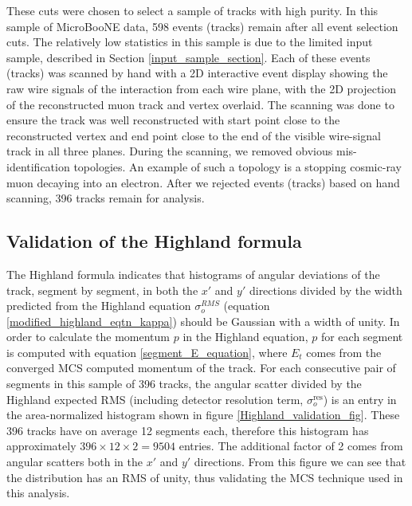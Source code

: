 \documentclass[a4paper,11pt]{article}
\begin{document}
These cuts were chosen to select a sample of tracks with high purity. In this sample of MicroBooNE data, 598 events (tracks) remain after all event selection cuts. The relatively low statistics in this sample is due to the limited input sample, described in Section \ref{input_sample_section}. Each of these events (tracks) was scanned by hand with a 2D interactive event display showing the raw wire signals of the interaction from each wire plane, with the 2D projection of the reconstructed muon track and vertex overlaid. The scanning was done to ensure the track was well reconstructed with start point close to the reconstructed vertex and end point close to the end of the visible wire-signal track in all three planes. During the scanning, we removed obvious mis-identification topologies. An example of such a topology is a stopping cosmic-ray muon decaying into an electron. After we rejected events (tracks) based on hand scanning, 396 tracks remain for analysis.


\subsection{Validation of the Highland formula}\label{highland_validation_section}
The Highland formula indicates that histograms of angular deviations of the track, segment by segment, in both the $x'$ and $y'$ directions divided by the width predicted from the Highland equation $\sigma_o^{RMS}$ (equation \ref{modified_highland_eqtn_kappa}) should be Gaussian with a width of unity. In order to calculate the momentum $p$ in the Highland equation, $p$ for each segment is computed with equation \ref{segment_E_equation}, where $E_t$ comes from the converged MCS computed momentum of the track. For each consecutive pair of segments in this sample of 396 tracks, the angular scatter divided by the Highland expected RMS (including detector resolution term, $\sigma_o^{\text{res}}$) is an entry in the area-normalized histogram shown in figure \ref{Highland_validation_fig}. These 396 tracks have on average 12 segments each, therefore this histogram has approximately $396\times12\times2=9504$ entries. The additional factor of 2 comes from angular scatters both in the $x'$ and $y'$ directions. From this figure we can see that the distribution has an RMS of unity, thus validating the MCS technique used in this analysis.
\end{document}
